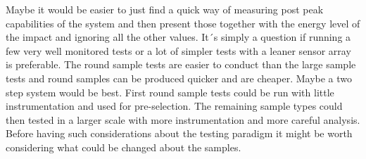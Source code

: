 

Maybe it would be easier to just find a quick way of measuring post peak capabilities of the system and then present those together with the energy level of the impact and ignoring all the other values. It´s simply a question if running a few very well monitored tests or a lot of simpler tests with a leaner sensor array is preferable. The round sample tests are easier to conduct than the large sample tests and round samples can be produced quicker and are cheaper. Maybe a two step system would be best. First round sample tests could be run with little instrumentation and used for pre-selection. The remaining sample types could then tested in a larger scale with more instrumentation and more careful analysis. Before having such considerations about the testing paradigm it might be worth considering what could be changed about the samples.

